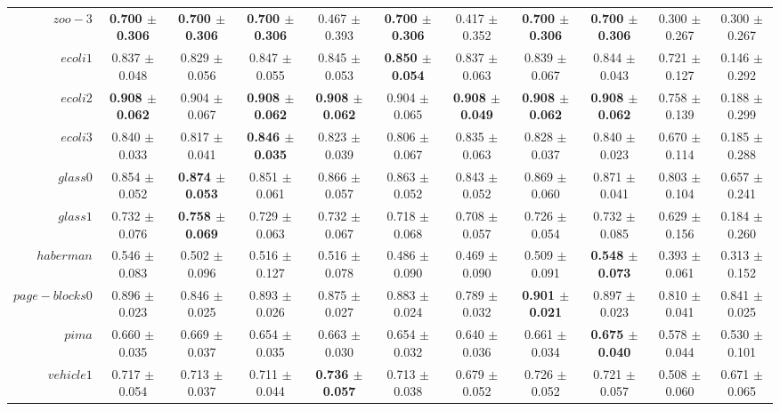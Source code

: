 \begin{table}[!ht]
{\begin{tabular}{r c c c c c c c c c c}
$zoo-3$ & \textbf{0.700 $\pm$ 0.306} & \textbf{0.700 $\pm$ 0.306} & \textbf{0.700 $\pm$ 0.306} & 0.467 $\pm$ 0.393 & \textbf{0.700 $\pm$ 0.306} & 0.417 $\pm$ 0.352 & \textbf{0.700 $\pm$ 0.306} & \textbf{0.700 $\pm$ 0.306} & 0.300 $\pm$ 0.267 & 0.300 $\pm$ 0.267 \\
$ecoli1$ & 0.837 $\pm$ 0.048 & 0.829 $\pm$ 0.056 & 0.847 $\pm$ 0.055 & 0.845 $\pm$ 0.053 & \textbf{0.850 $\pm$ 0.054} & 0.837 $\pm$ 0.063 & 0.839 $\pm$ 0.067 & 0.844 $\pm$ 0.043 & 0.721 $\pm$ 0.127 & 0.146 $\pm$ 0.292 \\
$ecoli2$ & \textbf{0.908 $\pm$ 0.062} & 0.904 $\pm$ 0.067 & \textbf{0.908 $\pm$ 0.062} & \textbf{0.908 $\pm$ 0.062} & 0.904 $\pm$ 0.065 & \textbf{0.908 $\pm$ 0.049} & \textbf{0.908 $\pm$ 0.062} & \textbf{0.908 $\pm$ 0.062} & 0.758 $\pm$ 0.139 & 0.188 $\pm$ 0.299 \\
$ecoli3$ & 0.840 $\pm$ 0.033 & 0.817 $\pm$ 0.041 & \textbf{0.846 $\pm$ 0.035} & 0.823 $\pm$ 0.039 & 0.806 $\pm$ 0.067 & 0.835 $\pm$ 0.063 & 0.828 $\pm$ 0.037 & 0.840 $\pm$ 0.023 & 0.670 $\pm$ 0.114 & 0.185 $\pm$ 0.288 \\
$glass0$ & 0.854 $\pm$ 0.052 & \textbf{0.874 $\pm$ 0.053} & 0.851 $\pm$ 0.061 & 0.866 $\pm$ 0.057 & 0.863 $\pm$ 0.052 & 0.843 $\pm$ 0.052 & 0.869 $\pm$ 0.060 & 0.871 $\pm$ 0.041 & 0.803 $\pm$ 0.104 & 0.657 $\pm$ 0.241 \\
$glass1$ & 0.732 $\pm$ 0.076 & \textbf{0.758 $\pm$ 0.069} & 0.729 $\pm$ 0.063 & 0.732 $\pm$ 0.067 & 0.718 $\pm$ 0.068 & 0.708 $\pm$ 0.057 & 0.726 $\pm$ 0.054 & 0.732 $\pm$ 0.085 & 0.629 $\pm$ 0.156 & 0.184 $\pm$ 0.260 \\
$haberman$ & 0.546 $\pm$ 0.083 & 0.502 $\pm$ 0.096 & 0.516 $\pm$ 0.127 & 0.516 $\pm$ 0.078 & 0.486 $\pm$ 0.090 & 0.469 $\pm$ 0.090 & 0.509 $\pm$ 0.091 & \textbf{0.548 $\pm$ 0.073} & 0.393 $\pm$ 0.061 & 0.313 $\pm$ 0.152 \\
$page-blocks0$ & 0.896 $\pm$ 0.023 & 0.846 $\pm$ 0.025 & 0.893 $\pm$ 0.026 & 0.875 $\pm$ 0.027 & 0.883 $\pm$ 0.024 & 0.789 $\pm$ 0.032 & \textbf{0.901 $\pm$ 0.021} & 0.897 $\pm$ 0.023 & 0.810 $\pm$ 0.041 & 0.841 $\pm$ 0.025 \\
$pima$ & 0.660 $\pm$ 0.035 & 0.669 $\pm$ 0.037 & 0.654 $\pm$ 0.035 & 0.663 $\pm$ 0.030 & 0.654 $\pm$ 0.032 & 0.640 $\pm$ 0.036 & 0.661 $\pm$ 0.034 & \textbf{0.675 $\pm$ 0.040} & 0.578 $\pm$ 0.044 & 0.530 $\pm$ 0.101 \\
$vehicle1$ & 0.717 $\pm$ 0.054 & 0.713 $\pm$ 0.037 & 0.711 $\pm$ 0.044 & \textbf{0.736 $\pm$ 0.057} & 0.713 $\pm$ 0.038 & 0.679 $\pm$ 0.052 & 0.726 $\pm$ 0.052 & 0.721 $\pm$ 0.057 & 0.508 $\pm$ 0.060 & 0.671 $\pm$ 0.065 \\

\end{tabular}}
\end{table}
